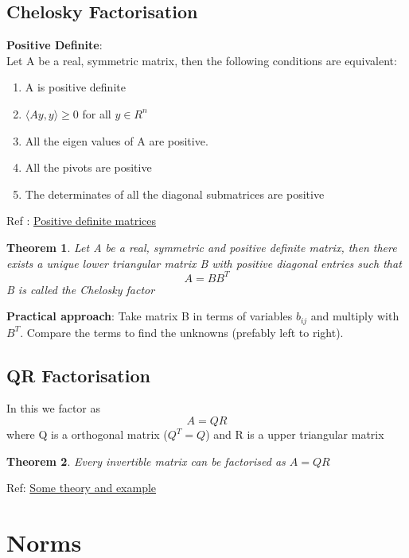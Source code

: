 \documentclass{article}
\newtheorem*{theorem}{Theorem}
\begin{document}
	\subsection{Chelosky Factorisation}
		\textbf{Positive Definite}:\\
		Let A be a real, symmetric matrix, then the following conditions are equivalent:
		\begin{enumerate}
		\item A is positive definite
		\item $\langle Ay, y \rangle \geq 0$  for all $y\in R^n$ 
		\item All the eigen values of A are positive.
		\item All the pivots are positive
		\item The determinates of all the diagonal submatrices are positive
		\end{enumerate}
		Ref : \href{http://slpl.cse.nsysu.edu.tw/chiaping/la/pdm.pdf}{Positive definite matrices}

		\begin{theorem}
			Let A be a \emph{real, symmetric and positive definite matrix}, then there exists a unique lower triangular matrix B with positive diagonal entries such that 
			\[A = BB^T\]
			B is called the Chelosky factor
		\end{theorem}

		\textbf{Practical approach}: Take matrix B in terms of variables $b_{ij}$ and multiply with $B^T$. Compare the terms to find the unknowns (prefably left to right).

	\subsection{QR Factorisation}
		In this we factor as 
		\[A = QR\]
		where Q is a orthogonal matrix ($Q^T = Q$) and R is a upper triangular matrix

		\begin{theorem}
			Every invertible matrix can be factorised as $A= QR$
		\end{theorem}
		Ref: \href{https://www.math.ucla.edu/~yanovsky/Teaching/Math151B/handouts/GramSchmidt.pdf}{Some theory and example}

\section{Norms}
\end{document}
